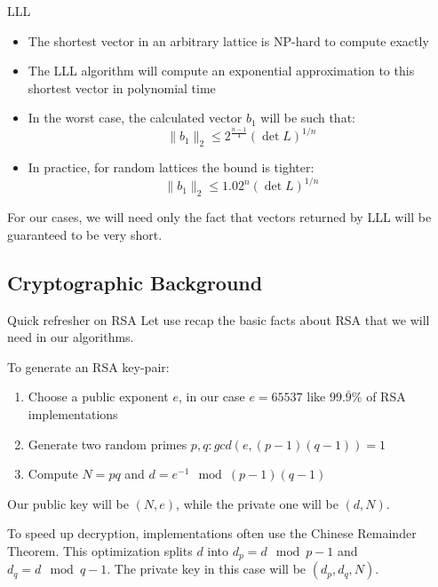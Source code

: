 \documentclass[usepdftitle=false]{beamer}
\begin{document}
\begin{frame}{LLL}
\begin{itemize}
    \item The shortest vector in an arbitrary lattice is NP-hard to compute exactly
    \item The LLL algorithm will compute an exponential approximation to this shortest vector
          in polynomial time
    \item In the worst case, the calculated vector $b_1$ will be such that:
    \begin{equation}
        \|b_1\|_2 \leq 2^{\frac{n-1}{4}}(\det L)^{1/n}
    \end{equation}
    \item In practice, for random lattices the bound is tighter:
    \begin{equation}
        \|b_1\|_2 \leq 1.02^n(\det L)^{1/n}
    \end{equation}
\end{itemize}

For our cases, we will need only the fact that vectors returned by LLL will be guaranteed to
be very short.
\end{frame}

\subsection{Cryptographic Background}
\begin{frame}{Quick refresher on RSA}
Let use recap the basic facts about RSA that we will need in our algorithms.

To generate an RSA key-pair:
\begin{enumerate}
    \item Choose a public exponent $e$, in our case $e = 65537$ like $99.\bar{9}\%$ of RSA 
          implementations
    \item Generate two random primes $p, q : gcd(e, (p-1)(q-1)) = 1$
    \item Compute $N = pq$ and $d = e^{-1} \mod (p-1)(q-1)$
\end{enumerate}

Our public key will be $(N, e)$, while the private one will be $(d, N)$.

\vspace{10pt}

To speed up decryption, implementations often use the Chinese Remainder Theorem. This 
optimization splits $d$ into $d_p = d \mod p-1$ and $d_q = d \mod q-1$. The private key in this 
case will be $(d_p, d_q, N)$.
\end{frame}
\end{document}
